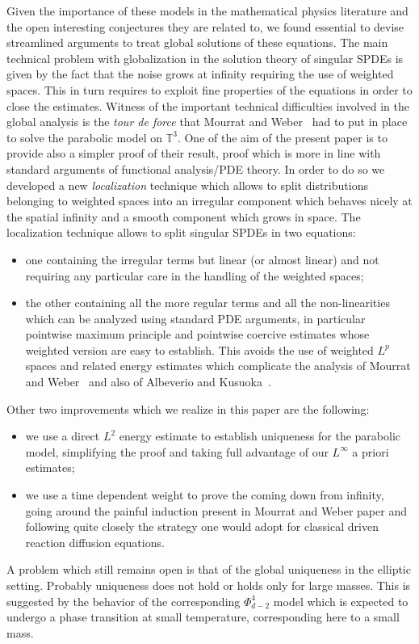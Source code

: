 \documentclass[a4paper,11pt]{article}
\numberwithin{equation}{section}
\newcommand{\8}{\infty}
\begin{document}
Given the importance of these models in the mathematical physics literature and the open interesting conjectures they are related to, we found essential to devise streamlined arguments to treat global solutions of these equations. The main technical problem with globalization in the solution theory of singular SPDEs is given by the fact that the noise grows at infinity requiring the use of weighted spaces. This in turn requires to exploit fine properties of the equations in order to close the estimates. Witness of the important technical difficulties involved in the global analysis is the \emph{tour de force} that Mourrat and Weber~\cite{MWcomedown} had to put in place to solve the parabolic model on $\mathbb{T}^3$. One of the aim of the present paper is to provide also a simpler proof of their result, proof which is more in line with standard arguments of functional analysis/PDE theory. 
In order to do so we developed a new \emph{localization} technique which allows to split distributions belonging to weighted spaces into an irregular component which behaves nicely at the spatial infinity and a smooth component which grows in space. The localization technique allows to split singular SPDEs in two equations:
\begin{itemize}
\item[-]
 one containing the irregular terms but linear (or almost linear) and not requiring any particular care in the handling of the weighted spaces;
 \item[-] the other containing all the more regular terms and all the non-linearities which can be analyzed using standard PDE arguments, in particular pointwise maximum principle and  pointwise coercive estimates whose weighted version are easy to establish. This avoids the use of weighted $L^p$ spaces and related energy estimates which complicate the analysis of Mourrat and Weber~\cite{MWcomedown} and also of  Albeverio and Kusuoka~\cite{albeverio_invariant_2017}.
\end{itemize}
Other two improvements which we realize in this paper are the following:
\begin{itemize}
\item[a)] we use a direct $L^2$ energy estimate to establish uniqueness for the parabolic model, simplifying the proof and taking full advantage of our $L^\infty$ a priori estimates;
\item[b)] we use a time dependent weight to prove the coming down from infinity, going around the painful induction present in Mourrat and Weber paper and following quite closely the strategy one would adopt for classical driven reaction diffusion equations.
\end{itemize}
A problem which still remains open is that of the global uniqueness in the elliptic setting. Probably uniqueness does not hold or holds only for large masses. This is suggested by the behavior of the corresponding $\Phi^4_{d-2}$ model which is expected to undergo a phase transition at small temperature, corresponding here to a small mass.
\end{document}

